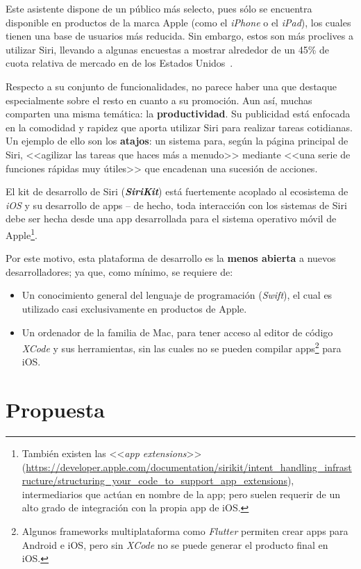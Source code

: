 \documentclass[11pt,spanish,listoffigures,listoftables,table,hyphens,dvipsnames]{tfgetsinf}
\newcommand{\fe}[1]{\foreign{english}{#1}}
\begin{document}
Este asistente dispone de un público más selecto, pues sólo se encuentra disponible en productos de la marca Apple (como el \emph{iPhone} o el \emph{iPad}), los cuales tienen una base de usuarios más reducida. Sin embargo, estos son más proclives a utilizar Siri, llevando a algunas encuestas a mostrar alrededor de un 45\% de cuota relativa de mercado en \fe{smartphones} de los Estados Unidos~\cite{voice-assistant-market-share}.

Respecto a su conjunto de funcionalidades, no parece haber una que destaque especialmente sobre el resto en cuanto a su promoción. Aun así, muchas comparten una misma temática: la \textbf{productividad}. Su publicidad está enfocada en la comodidad y rapidez que aporta utilizar Siri para realizar tareas cotidianas. Un ejemplo de ello son los \textbf{atajos}: un sistema para, según la página principal de Siri,  <<agilizar las tareas que haces más a menudo>> mediante <<una serie de funciones rápidas muy útiles>> que encadenan una sucesión de acciones.

El kit de desarrollo de Siri (\textbf{\emph{SiriKit}}) está fuertemente acoplado al ecosistema de \emph{iOS} y su desarrollo de apps -- de hecho, toda interacción con los sistemas de Siri debe ser hecha desde una app desarrollada para el sistema operativo móvil de Apple\footnote{También existen las <<\emph{app extensions}>> (\url{https://developer.apple.com/documentation/sirikit/intent_handling_infrastructure/structuring_your_code_to_support_app_extensions}), intermediarios que actúan en nombre de la app; pero suelen requerir de un alto grado de integración con la propia app de iOS.}.

Por este motivo, esta plataforma de desarrollo es la \textbf{menos abierta} a nuevos desarrolladores; ya que, como mínimo, se requiere de:

\begin{itemize}
   \item Un conocimiento general del lenguaje de programación (\emph{Swift}), el cual es utilizado casi exclusivamente en productos de Apple.
   \item Un ordenador de la familia de Mac, para tener acceso al editor de código \emph{XCode} y sus herramientas, sin las cuales no se pueden compilar apps\footnote{Algunos frameworks multiplataforma como \emph{Flutter} permiten crear apps para Android e iOS, pero sin \emph{XCode} no se puede generar el producto final en iOS.} para iOS.
\end{itemize}

\section{Propuesta}
\end{document}

